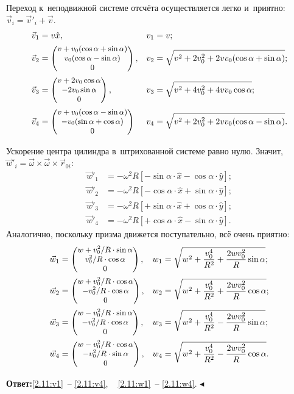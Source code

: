 \documentclass{weekly}
\begin{document}
Переход к~неподвижной системе отсчёта осуществляется легко и~приятно:
$\vec v_i = \vec v'_i + \vec v$.
\begin{align}
    \vec v_1 &= v \hat x, & \label{2.11:v1}
        v_1 &= v; \\
    \vec v_2 &= \small\begin{pmatrix}v + v_0 (\cos\alpha + \sin\alpha)\\v_0 (\cos\alpha - \sin\alpha)\\0\end{pmatrix}, & \label{2.11:v2}
        v_2 &= \sqrt{v^2 + 2v_0^2 +
            2vv_0 (\cos\alpha + \sin\alpha)}; \\
    \vec v_3 &= \small\begin{pmatrix}v + 2v_0 \cos\alpha\\-2v_0 \sin\alpha\\0\end{pmatrix}, &
        \label{2.11:v3}
        v_3 &= \sqrt{v^2 + 4v_0^2 + 4vv_0 \cos\alpha}; \\
    \vec v_4 &= \small\begin{pmatrix}v + v_0 (\cos\alpha - \sin\alpha)\\-v_0 (\sin\alpha + \cos\alpha)\\0\end{pmatrix} & \label{2.11:v4}
        v_4 &= \sqrt{v^2 + 2v_0^2 + 2vv_0 (\cos\alpha - \sin\alpha)}.
\end{align}

Ускорение центра цилиндра в~штрихованной системе равно нулю.
Значит, $\vec w'_i = \vec\omega \times \vec\omega \times \vec r_{0i}$:
\begin{align}
    \vec w'_1 &= -\omega^2 R \left[ -\sin\alpha \cdot \hat x -
            \cos\alpha \cdot \hat y \right]; \\
    \vec w'_2 &= -\omega^2 R \left[ -\cos\alpha \cdot \hat x +
            \sin\alpha \cdot \hat y \right]; \\
    \vec w'_3 &= -\omega^2 R \left[ +\sin\alpha \cdot \hat x +
            \cos\alpha \cdot \hat y \right]; \\
    \vec w'_4 &= -\omega^2 R \left[ +\cos\alpha \cdot \hat x -
            \sin\alpha \cdot \hat y \right].
\end{align}
Аналогично, поскольку призма движется поступательно, всё очень приятно:
\begin{align}
    \vec w_1 &= \small\begin{pmatrix}w + v_0^2/R \cdot \sin\alpha\\v_0^2/R \cdot \cos\alpha\\0\end{pmatrix}, & \label{2.11:w1}
        w_1 &= \sqrt{w^2 + \frac{v_0^4}{R^2} +
            \frac{2wv_0^2}{R}\sin\alpha}; \\
    \vec w_2 &= \small\begin{pmatrix}w + v_0^2/R \cdot \cos\alpha\\-v_0^2/R \cdot \cos\alpha\\0\end{pmatrix}, & \label{2.11:w2}
        w_2 &= \sqrt{w^2 + \frac{v_0^4}{R^2} +
            \frac{2wv_0^2}{R}\cos\alpha}; \\
    \vec w_3 &= \small\begin{pmatrix}w - v_0^2/R \cdot \sin\alpha\\-v_0^2/R \cdot \cos\alpha\\0\end{pmatrix}, & \label{2.11:w3}
        w_3 &= \sqrt{w^2 + \frac{v_0^4}{R^2} -
            \frac{2wv_0^2}{R}\sin\alpha}; \\
    \vec w_4 &= \small\begin{pmatrix}w - v_0^2/R \cdot \cos\alpha\\-v_0^2/R \cdot \sin\alpha\\0\end{pmatrix}, & \label{2.11:w4}
        w_4 &= \sqrt{w^2 + \frac{v_0^4}{R^2} -
            \frac{2wv_0^2}{R}\cos\alpha}.
\end{align}

\textbf{Ответ:}\quad \eqref{2.11:v1}~-- \eqref{2.11:v4}, ~
\eqref{2.11:w1}~-- \eqref{2.11:w4}.
\hfill $\blacktriangleleft$
\end{document}
